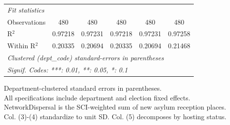\begin{table}[htbp]
\begin{tabular}{lccccc}
      \midrule
      \emph{Fit statistics}\\
      Observations                             & 480            & 480            & 480           & 480           & 480\\  
      R$^2$                                    & 0.97218        & 0.97231        & 0.97218       & 0.97231       & 0.97258\\  
      Within R$^2$                             & 0.20335        & 0.20694        & 0.20335       & 0.20694       & 0.21468\\  
      \midrule \midrule
      \multicolumn{6}{l}{\emph{Clustered (dept\_code) standard-errors in parentheses}}\\
      \multicolumn{6}{l}{\emph{Signif. Codes: ***: 0.01, **: 0.05, *: 0.1}}\\
   \end{tabular}
   
   \par \raggedright 
   Department-clustered standard errors in parentheses.\\
   All specifications include department and election fixed effects.\\
   NetworkDispersal is the SCI-weighted sum of new asylum reception places.\\
   Col. (3)-(4) standardize to unit SD. Col. (5) decomposes by hosting status.
\end{table}


